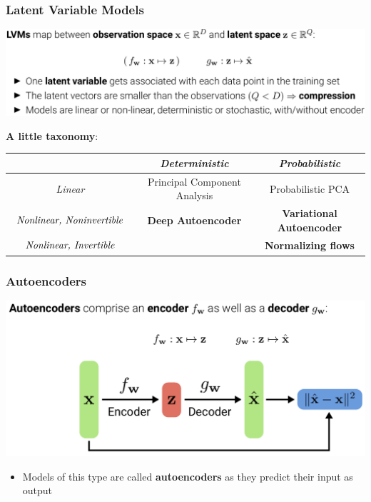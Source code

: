 \documentclass[10pt,aspectratio=169]{beamer}
\begin{document}
\begin{frame}
  \frametitle{Latent Variable Models}
\begin{center}
\includegraphics[width=.9\textwidth]{images/s2}
\end{center}


\small{\textbf{A little taxonomy}:}
\begin{center}
\small{\begin{tabular}{|c|c|c|}
\hline & \emph{Deterministic} & \emph{Probabilistic} \\
\hline \emph{Linear} & Principal Component Analysis & Probabilistic PCA\\
\hline $\begin{array}{c}\text{\emph{Nonlinear, Noninvertible}}\end{array}$
 & \textbf{Deep Autoencoder} & \textbf{Variational Autoencoder}\\
\hline $\begin{array}{c}\text{\emph{Nonlinear, Invertible}}\end{array}$ & & \textbf{Normalizing flows}\\\hline
\end{tabular}
}
\end{center}
\end{frame}


\begin{frame}
  \frametitle{Autoencoders}
\begin{center}
\includegraphics[width=.9\textwidth]{images/s3}
\end{center}
\begin{itemize}
\item Models of this type are called \textbf{autoencoders} as they predict their input as output
\end{itemize}

\end{frame}
\end{document}
